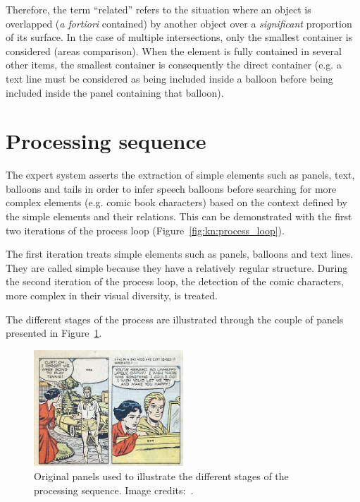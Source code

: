 Therefore, the term ``related'' refers to the situation where an object is overlapped (\emph{a fortiori} contained) by another object over a \emph{significant} proportion of its surface.
In the case of multiple intersections, only the smallest container is considered (areas comparison).
When the element is fully contained in several other items, the smallest container is consequently the direct container (e.g. a text line must be considered as being included inside a balloon before being included inside the panel containing that balloon).

\section{Processing sequence} %
\label{sec:kn:processing_sequence}

The expert system asserts the extraction of simple elements such as panels, text, balloons and tails in order to infer speech balloons before searching for more complex elements (e.g. comic book characters) based on the context defined by the simple elements and their relations.
This can be demonstrated with the first two iterations of the process loop (Figure~\ref{fig:kn:process_loop}).

The first iteration treats simple elements such as panels, balloons and text lines.
They are called simple because they have a relatively regular structure.
During the second iteration of the process loop, the detection of the comic characters, more complex in their visual diversity, is treated.

The different stages of the process are illustrated through the couple of panels presented in Figure~\ref{fig:casesExampleReconnaissance}.

\begin{figure}[!h]  %
\centering
\includegraphics[width=0.5\textwidth]{process_illustration.jpg}
\caption[Original panels used to illustrate the different stages of the processing sequence]{Original panels used to illustrate the different stages of the processing sequence. Image credits:~\cite{Jay53}.}
\label{fig:casesExampleReconnaissance}
\end{figure}

